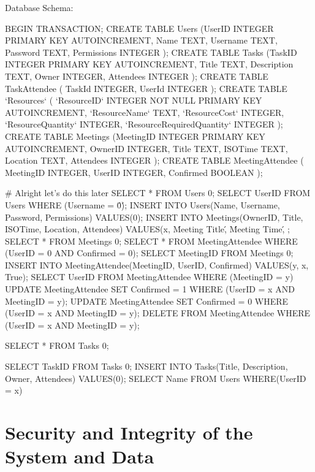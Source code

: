     Database Schema:
\begin{sql}
    BEGIN TRANSACTION;
CREATE TABLE Users
                (UserID INTEGER PRIMARY KEY AUTOINCREMENT,
                Name TEXT,
                Username TEXT,
                Password TEXT,
                Permissions INTEGER
                );
CREATE TABLE Tasks
                (TaskID INTEGER PRIMARY KEY AUTOINCREMENT,
                Title TEXT,
                Description TEXT,
                Owner INTEGER,
                Attendees INTEGER
                );
CREATE TABLE TaskAttendee
                (
                TaskId INTEGER,
                UserId INTEGER
                );
CREATE TABLE `Resources` (
	`ResourceID`	INTEGER NOT NULL PRIMARY KEY AUTOINCREMENT,
	`ResourceName`	TEXT,
	`ResourceCost`	INTEGER,
	`ResourceQuantity`	INTEGER,
	`ResourceRequiredQuantity`	INTEGER
);
CREATE TABLE Meetings
                (MeetingID INTEGER PRIMARY KEY AUTOINCREMENT,
                OwnerID INTEGER,
                Title TEXT,
                ISOTime TEXT,
                Location TEXT,
                Attendees INTEGER
                );
CREATE TABLE MeetingAttendee
(
    MeetingID INTEGER,
    UserID INTEGER,
    Confirmed BOOLEAN
);


# Alright let's do this later
SELECT * FROM Users {0};
SELECT UserID FROM Users WHERE (Username = \'{0}\');
INSERT INTO Users(Name, Username, Password, Permissions) VALUES({0});
INSERT INTO Meetings(OwnerID, Title, ISOTime, Location, Attendees) VALUES(x, \'Meeting Title\', \'Meeting Time\',  ;
SELECT * FROM Meetings {0};
SELECT * FROM MeetingAttendee WHERE (UserID = {0} AND Confirmed = 0);
SELECT MeetingID FROM Meetings {0};
INSERT INTO MeetingAttendee(MeetingID, UserID, Confirmed) VALUES(y, x, True);
SELECT UserID FROM MeetingAttendee WHERE (MeetingID = y)
UPDATE MeetingAttendee SET Confirmed = 1 WHERE (UserID = x AND MeetingID = y);
UPDATE MeetingAttendee SET Confirmed = 0 WHERE (UserID = x AND MeetingID = y);
DELETE FROM MeetingAttendee WHERE (UserID = x AND MeetingID = y);

SELECT * FROM Tasks {0};

SELECT TaskID FROM Tasks {0};
INSERT INTO Tasks(Title, Description, Owner, Attendees) VALUES({0});
SELECT Name FROM Users WHERE(UserID = x)

\end{sql}


\section{Security and Integrity of the System and Data}

